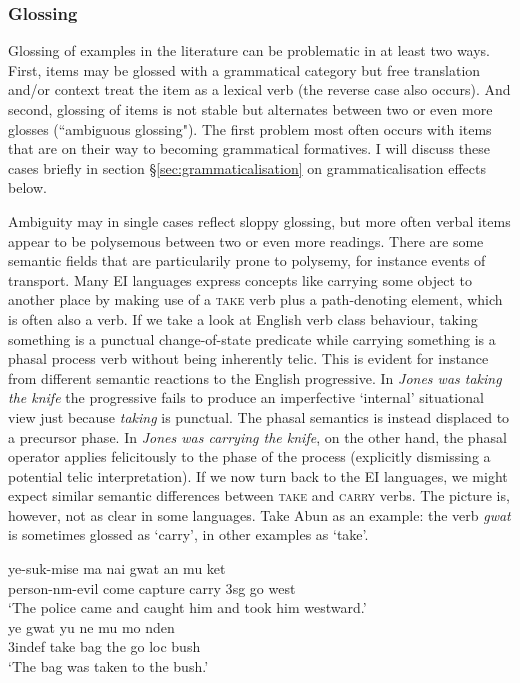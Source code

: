 \subsubsection{Glossing} \label{sec:verbglossing}

Glossing of examples in the literature can be problematic in at least two ways. First, items may be glossed with a grammatical category but free translation and/or context treat the item as a lexical verb (the reverse case also occurs). And second, glossing of items is not stable but alternates between two or even more glosses (``ambiguous glossing"). The first problem most often occurs with items that are on their way to becoming grammatical formatives. I will discuss these cases briefly in section §\ref{sec:grammaticalisation} on grammaticalisation effects below.

Ambiguity may in single cases reflect sloppy glossing, but more often verbal items appear to be polysemous between two or even more readings. There are some semantic fields that are particularily prone to polysemy, for instance events of transport. Many EI languages express concepts like carrying some object to another place by making use of a \textsc{take} verb plus a path-denoting element, which is often also a verb. If we take a look at English verb class behaviour, taking something is a punctual change-of-state predicate while carrying something is a phasal process verb without being inherently telic. This is evident for instance from different semantic reactions to the English progressive. In \textit{Jones was taking the knife} the progressive fails to produce an imperfective `internal' situational view just because \textit{taking} is punctual. The phasal semantics is instead displaced to a precursor phase. In \textit{Jones was carrying the knife}, on the other hand, the phasal operator applies felicitously to the phase of the process (explicitly dismissing a potential telic interpretation). If we now turn back to the EI languages, we might expect similar semantic differences between \textsc{take} and \textsc{carry} verbs. The picture is, however, not as clear in some languages. Take Abun as an example: the verb \textit{gwat} is sometimes glossed as `carry', in other examples as `take'.

\ea \label{}
\gll ye-suk-mise ma nai gwat an mu ket \\
person-\acs{nm}-evil come capture carry 3\acs{sg} go west \\
\glft `The police came and caught him and took him westward.' \\ 
\z
\xe
\ea \label{}
\gll ye gwat yu ne mu mo nden \\
3\acs{indef} take bag the go \acs{loc} bush \\
\glft `The bag was taken to the bush.' \\ 
\z
\xe

